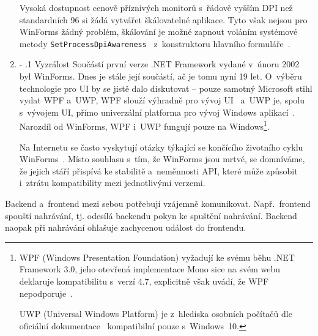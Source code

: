 \documentclass[12pt, a4paper, twoside]{article}
\makeatletter
\renewcommand\paragraph{%
	\@startsection{subparagraph}{5}{0mm}%
	{-\baselineskip}%
	{.1\baselineskip}%
	{\normalfont\normalsize\bfseries}}
\makeatother
\begin{document}
\begin{enumerate}[leftmargin=*]
		Vysoká dostupnost cenově příznivých monitorů s~řádově vyšším DPI než standardních 96 si žádá vytvářet škálovatelné aplikace. Tyto však nejsou pro WinForms žádný problém, škálování je možné zapnout voláním systémové metody \texttt{SetProcessDpiAwareness}~\cite{dpiawarenessWinApi} z~konstruktoru hlavního formuláře~\cite{winformsDpiScaling}.
		\item \paragraph{Vyzrálost}
		Součástí první verze .NET Framework vydané v~únoru 2002 byl WinForms. Dnes je stále její součástí, ač je tomu nyní 19 let. O~výběru technologie pro UI by se jistě dalo diskutovat -- pouze samotný Microsoft stihl vydat WPF a~UWP, WPF slouží výhradně pro vývoj UI~\cite{wpfDocs} a~UWP je, spolu s~vývojem UI, přímo univerzální platforma pro vývoj Windows aplikací~\cite{uwpDocs}. Narozdíl od WinForms, WPF i~UWP fungují pouze na Windows\footnote{WPF (Windows Presentation Foundation) vyžadují ke svému běhu .NET Framework 3.0, jeho otevřená implementace Mono \cite{monoProject} sice na svém webu deklaruje kompatibilitu s~verzí 4.7, explicitně však uvádí, že WPF nepodporuje~\cite{monoCompatibility}.
			
			UWP (Universal Windows Platform) je z~hlediska osobních počítačů dle oficiální dokumentace~\cite{uwpSupportedPlatforms} kompatibilní pouze s~Windows~10.
		}. 
		
		
		Na Internetu se často vyskytují otázky týkající se končícího životního cyklu WinForms~\cite{winformObselote1,winformsObselote2,winformsObselote3, winformsObselote4, winformsObselote5}. Místo souhlasu s~tím, že WinForms jsou mrtvé, se domníváme, že jejich stáří přispívá ke stabilitě a~neměnnosti API, které může způsobit i~ztrátu kompatibility mezi jednotlivými verzemi.
		
	\end{enumerate}
	Backend a~frontend mezi sebou potřebují vzájemně komunikovat. Např.~frontend spouští nahrávání, tj. odesílá backendu pokyn ke spuštění nahrávání. Backend naopak při nahrávání ohlašuje zachycenou událost do frontendu. 
	
\end{document}
